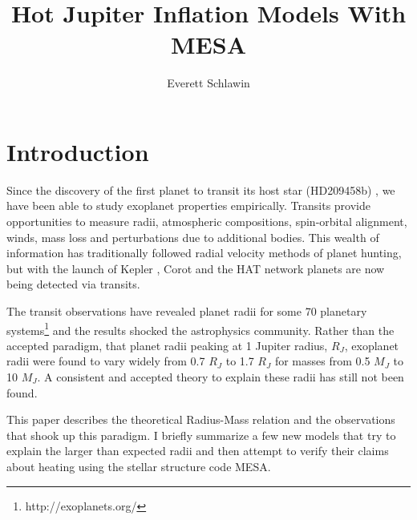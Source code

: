 \documentclass[twocolumn]{emulateapj}
\begin{document}
\title{Hot Jupiter Inflation Models With MESA}
\author{Everett Schlawin}

\maketitle
\section{Introduction}

Since the discovery of the first planet to transit its host star
(HD209458b) \citep{charb,henry2000}, we have been able to study
exoplanet properties empirically. Transits provide opportunities to
measure radii, atmospheric compositions, spin-orbital alignment,
winds, mass loss and perturbations due to additional bodies. This
wealth of information has traditionally followed radial velocity
methods of planet hunting, but with the launch of Kepler
\citep{borucki}, Corot and the HAT network \citep{bakos} planets are
now being detected via transits.

The transit observations have revealed planet radii for some 70
planetary systems\footnote{http://exoplanets.org/} and the results
shocked the astrophysics community. Rather than the accepted paradigm,
that planet radii peaking at 1 Jupiter radius, $R_J$, exoplanet radii
were found to vary widely from 0.7 $R_J$ to 1.7 $R_J$ for masses from
0.5 $M_J$ to 10 $M_J$. A consistent and accepted theory to explain
these radii has still not been found.

This paper describes the theoretical Radius-Mass relation and the
observations that shook up this paradigm. I briefly summarize a few
new models that try to explain the larger than expected radii and then
attempt to verify their claims about heating using the stellar
structure code MESA.
\end{document}
